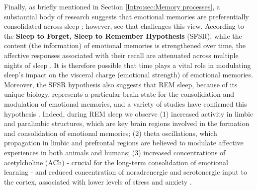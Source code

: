 Finally, as briefly mentioned in Section \ref{Intro:sec:Memory processes}, a substantial body of research suggests that emotional memories are preferentially consolidated across sleep \parencite{alger_preferential_2018,cairney_targeted_2014,cunningham_psychophysiological_2014,groch_role_2013,hu_sleep_2006,nishida_rem_2009,tempesta_emotional_2015,wagner_brief_2006,wagner_emotional_2001}; however, see \parencite{lipinska_preferential_2019} that challenges this view. According to the \textbf{Sleep to Forget, Sleep to Remember Hypothesis} (SFSR), while the content (the information) of emotional memories is strengthened over time, the affective responses associated with their recall are attenuated across multiple nights of sleep \parencite{helm_overnight_2010,walker_role_2009}. It is therefore possible that time plays a vital role in modulating sleep’s impact on the visceral charge (emotional strength) of emotional memories. Moreover, the SFSR hypothesis also suggests that REM sleep, because of its unique biology, represents a particular brain state for the consolidation and modulation of emotional memories, and a variety of studies have confirmed this hypothesis \parencite{groch_role_2013,groch_dissociating_2015,harrington_influence_2018,helm_overnight_2010,hutchison_targeted_2021,nishida_rem_2009,menz_role_2013,menz_rem_2016,payne_sleep_2012,wagner_emotional_2001,wagner_brief_2006,wassing_restless_2019}.
Indeed, during REM sleep we observe (1) increased activity in limbic and paralimbic structures, which are key brain regions involved in the formation and consolidation of emotional memories; (2) theta oscillations, which propagation in limbic and prefrontal regions are believed to modulate affective experiences in both animals and humans; (3) increased concentrations of acetylcholine (ACh) - crucial for the long-term consolidation of emotional learning - and reduced concentration of noradrenergic and serotonergic input to the cortex, associated with lower levels of stress and anxiety \parencite[see] [for reviews]{walker_role_2009, helm_overnight_2010}.
\FloatBarrier
